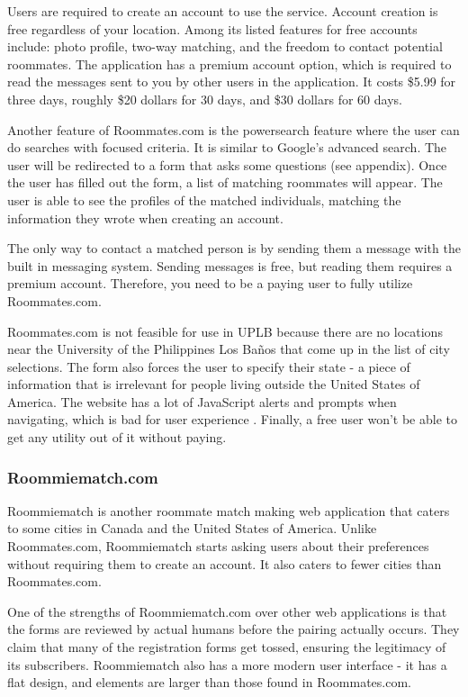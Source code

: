 \documentclass[journal]{IEEEtran}
\newcommand{\UPLB}{University of the Philippines Los Ba\~{n}os }
\begin{document}
        Users are required to create an account to use the service. Account creation is free regardless of your location. Among
        its listed features for free accounts include: photo profile, two-way matching, and the freedom to contact potential
        roommates. The application has a premium account option, which is required to read the messages sent to you by other
        users in the application. It costs \$5.99 for three days, roughly \$20 dollars for 30 days, and \$30 dollars for 60
        days. 

        Another feature of Roommates.com is the powersearch feature where the user can do searches with focused criteria. It is
        similar to Google's advanced search. The user will be redirected to a form that asks some questions (see appendix). Once
        the user has filled out the form, a list of matching roommates will appear. The user is able to see the profiles of the
        matched individuals, matching the information they wrote when creating an account. 

        The only way to contact a matched person is by sending them a message with the built in messaging system. Sending
        messages is free, but reading them requires a premium account. Therefore, you need to be a paying user to fully utilize
        Roommates.com.

        Roommates.com is not feasible for use in UPLB because there are no locations near the \UPLB that come up in the list of
        city selections. The form also forces the user to specify their state - a piece of information that is irrelevant for
        people living outside the United States of America. The website has a lot of JavaScript alerts and prompts when
        navigating, which is bad for user experience \cite{UX1}. Finally, a free user won't be able to get any utility out of it
        without paying.

        \subsubsection{Roommiematch.com}
        Roommiematch is another roommate match making web application that caters to some cities in Canada and the United States
        of America. Unlike Roommates.com, Roommiematch starts asking users about their preferences without requiring them to
        create an account. It also caters to fewer cities than Roommates.com.

        One of the strengths of Roommiematch.com over other web applications is that the forms are reviewed by actual humans
        before the pairing actually occurs. They claim that many of the registration forms get tossed, ensuring the legitimacy
        of its subscribers. Roommiematch also has a more modern user interface - it has a flat design, and elements are larger
        than those found in Roommates.com.
\end{document}
